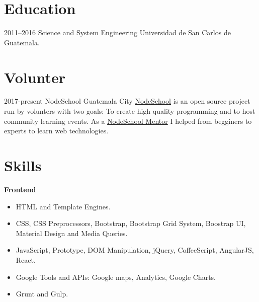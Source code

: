 \documentclass[]{friggeri-cv} %
\begin{document}

\section{Education}

\begin{entrylist}
\entry
{2011--2016}
{Science and System Engineering}
{Universidad de San Carlos de Guatemala.}
{}
\end{entrylist}

\section{Volunter}
\begin{entrylist}
\entry
	{2017-present}
	{NodeSchool}
	{Guatemala City}
	{\href{https://nodeschool.io}{NodeSchool} is an open source project run by volunters with two goals: To create high quality
	programming and to host community learning events. As a \href{https://nodeschool.io/guatemala/}{NodeSchool Mentor}
	I helped from begginers to experts to learn web technologies.}
\end{entrylist}

\section{Skills}

\textbf{Frontend}

\begin{itemize}
	\item HTML and Template Engines.
	\item CSS, CSS Preprocessors, Bootstrap, Bootstrap Grid System, Boostrap UI, Material Design and Media Queries.
	\item JavaScript, Prototype, DOM Manipulation, jQuery, CoffeeScript, AngularJS, React.
	\item Google Tools and APIs: Google maps, Analytics, Google Charts.
	\item Grunt and Gulp.
\end{itemize}
\end{document}
